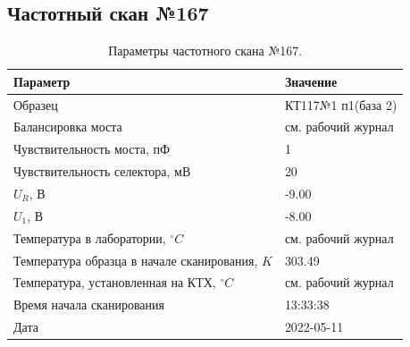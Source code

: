 \subsection{Частотный скан №167}
\begin{table}[!ht]
    \centering
    \caption{Параметры частотного скана №167.}
    \begin{tabular}{|l|l|}
        \hline
        Параметр                                       & Значение                  \\ \hline
        Образец                                        & КТ117№1 п1(база 2)        \\ \hline
        Балансировка моста                             & см. рабочий журнал        \\ \hline
        Чувствительность моста, пФ                     & 1                         \\ \hline
        Чувствительность селектора, мВ                 & 20                        \\ \hline
        $U_R$, В                                       & -9.00                     \\ \hline
        $U_1$, В                                       & -8.00                     \\ \hline
        Температура в лаборатории, $^\circ C$          & см. рабочий журнал        \\ \hline
        Температура образца в начале сканирования, $K$ & 303.49                    \\ \hline
        Температура, установленная на КТХ, $^\circ C$  & см. рабочий журнал        \\ \hline
        Время начала сканирования                      & 13:33:38                  \\ \hline
        Дата                                           & 2022-05-11                \\ \hline
    \end{tabular}
    \label{table:frequency_scan_167}
\end{table}

